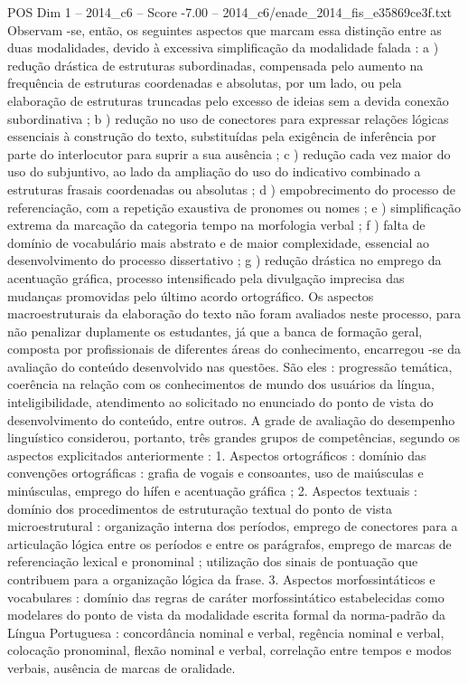 \begin{textsample}{POS Dim 1 – 2014\_c6 – Score -7.00 – 2014\_c6/enade\_2014\_fis\_e35869ce3f.txt}
Observam -se, então, os seguintes aspectos que marcam essa distinção entre as duas modalidades, devido à excessiva simplificação da modalidade falada : a ) redução drástica de estruturas subordinadas, compensada pelo aumento na frequência de estruturas coordenadas e absolutas, por um lado, ou pela elaboração de estruturas truncadas pelo excesso de ideias sem a devida conexão subordinativa ; b ) redução no uso de conectores para expressar relações lógicas essenciais à construção do texto, substituídas pela exigência de inferência por parte do interlocutor para suprir a sua ausência ; c ) redução cada vez maior do uso do subjuntivo, ao lado da ampliação do uso do indicativo combinado a estruturas frasais coordenadas ou absolutas ; d ) empobrecimento do processo de referenciação, com a repetição exaustiva de pronomes ou nomes ; e ) simplificação extrema da marcação da categoria tempo na morfologia verbal ; f ) falta de domínio de vocabulário mais abstrato e de maior complexidade, essencial ao desenvolvimento do processo dissertativo ; g ) redução drástica no emprego da acentuação gráfica, processo intensificado pela divulgação imprecisa das mudanças promovidas pelo último acordo ortográfico.
Os aspectos macroestruturais da elaboração do texto não foram avaliados neste processo, para não penalizar duplamente os estudantes, já que a banca de formação geral, composta por profissionais de diferentes áreas do conhecimento, encarregou -se da avaliação do conteúdo desenvolvido nas questões.
São eles : progressão temática, coerência na relação com os conhecimentos de mundo dos usuários da língua, inteligibilidade, atendimento ao solicitado no enunciado do ponto de vista do desenvolvimento do conteúdo, entre outros.
A grade de avaliação do desempenho linguístico considerou, portanto, três grandes grupos de competências, segundo os aspectos explicitados anteriormente : 1.
Aspectos ortográficos : domínio das convenções ortográficas : grafia de vogais e consoantes, uso de maiúsculas e minúsculas, emprego do hífen e acentuação gráfica ; 2.
Aspectos textuais : domínio dos procedimentos de estruturação textual do ponto de vista microestrutural : organização interna dos períodos, emprego de conectores para a articulação lógica entre os períodos e entre os parágrafos, emprego de marcas de referenciação lexical e pronominal ; utilização dos sinais de pontuação que contribuem para a organização lógica da frase. 3.
Aspectos morfossintáticos e vocabulares : domínio das regras de caráter morfossintático estabelecidas como modelares do ponto de vista da modalidade escrita formal da norma-padrão da Língua Portuguesa : concordância nominal e verbal, regência nominal e verbal, colocação pronominal, flexão nominal e verbal, correlação entre tempos e modos verbais, ausência de marcas de oralidade.

\end{textsample}
